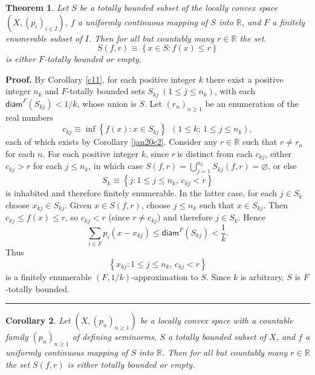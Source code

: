\documentclass{article}%
\newtheorem{theorem}{Theorem}
\newtheorem{corollary}[theorem]{Corollary}
\newenvironment{proof}[1][Proof]{\noindent\textbf{#1.} }{\ \rule{0.5em}{0.5em}}
\begin{document}
\begin{theorem}
\label{t11}Let $S$ be a totally bounded subset of the locally convex space
$\left(  X,\left(  p_{i}\right)  _{i\in I}\right)  $, $f$ a uniformly
continuous mapping of $S$ into $\mathbb{R}$, and $F$ a finitely enumerable
subset of $I$. Then for all but countably many $r\in\mathbb{R}$ the set$.$%
\[
S(f,r)\equiv\left\{  x\in S:f(x)\leq r\right\}
\]
is either $F$-totally bounded or empty.
\end{theorem}

\begin{proof}
By Corollary \ref{c11}, for each positive integer $k$ there exist a positive
integer $n_{k}$ and $F$-totally bounded sets $S_{kj}\ \left(  1\leq j\leq
n_{k}\right)  $, with each $\mathsf{diam}^{F}(S_{kj})<1/k$, whose union is
$S$. Let $\left(  r_{n}\right)  _{n\geq1}$ be an enumeration of the real
numbers%
\[
c_{kj}\equiv\inf\left\{  f(x):x\in S_{kj}\right\}  \ \ (1\leq k;\,1\leq j\leq
n_{k}),
\]
each of which exists by Corollary \ref{jan20c2}. Consider any $r\in\mathbb{R}$
such that $r\neq r_{n}$ for each $n$. For each positive integer $k$, since
$r\ $is distinct from each $c_{kj}$, either $c_{kj}>r$ for each $j\leq n_{k}$,
in which case $S(f,r)=%
{\textstyle\bigcup_{j=1}^{n_{k}}}
S_{kj}(f,r)=\varnothing$, or else%
\[
S_{k}\equiv\left\{  j:1\leq j\leq n_{k},\,c_{kj}<r\right\}
\]
is inhabited and therefore finitely enumerable. In the latter case, for each
$j\in S_{k}$ choose $x_{kj}\in S_{kj}$. Given $x\in S(f,r)$, choose $j\leq
n_{k}$ such that $x\in S_{kj}$. Then $c_{kj}\leq f(x)\leq r$, so $c_{kj}<r$
(since $r\neq c_{kj}$) and therefore $j\in S_{k}$. Hence%
\[
\sum_{i\in F}p_{i}(x-x_{kj})\leq\mathsf{diam}^{F}(S_{kj})<\frac{1}{k}.
\]
Thus%
\[
\left\{  x_{kj}:1\leq j\leq n_{k}\text{, }c_{kj}<r\right\}
\]
is a finitely enumerable $(F,1/k)$-approximation to $S$. Since $k$ is
arbitrary, $S$ is $F$-totally bounded.
\end{proof}

\begin{corollary}
\label{c22}Let $\left(  X,\left(  p_{n}\right)  _{n\geq1}\right)  $ be a
locally convex space with a countable family $\left(  p_{n}\right)  _{n\geq1}$
of defining seminorms, $S$ a totally bounded subset of $X$, and $f$ a
uniformly continuous mapping of $S$ into $\mathbb{R}$. Then for all but
countably many $r\in\mathbb{R}$ the set $S(f,r)$ is either totally bounded or empty.
\end{corollary}
\end{document}
